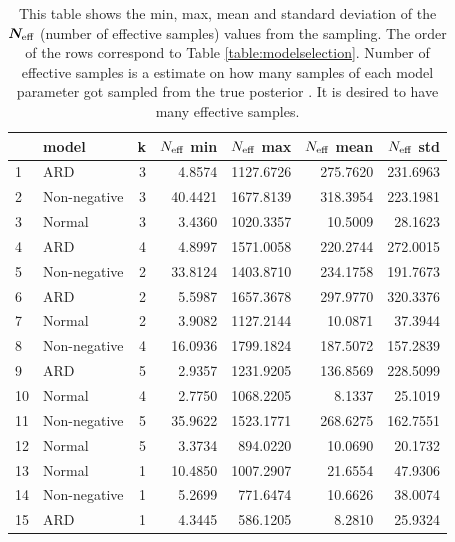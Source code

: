 \documentclass[12pt]{article}
\begin{document}
    \begin{table}[H]
        \centering
        \caption{This table shows the min, max, mean and standard deviation of the $\boldsymbol{N_{\text{eff}}}$ (number of effective samples) values from the sampling. The order of the rows correspond to Table \ref{table:modelselection}. Number of effective samples is a estimate on how many samples of each model parameter got sampled from the true posterior \cite{Neff}. It is desired to have many effective samples.}
        \label{table:neffs}
        \begin{tabular}{llr|rr|rr}
            \toprule
            {} &         model &  k &  $N_{\text{eff}}$ min &  $N_{\text{eff}}$ max &  $N_{\text{eff}}$ mean &  $N_{\text{eff}}$ std \\
            \midrule
            1  &           ARD &  3 &    4.8574 & 1127.6726 &   275.7620 &  231.6963 \\
            2  &  Non-negative &  3 &   40.4421 & 1677.8139 &   318.3954 &  223.1981 \\
            3  &        Normal &  3 &    3.4360 & 1020.3357 &    10.5009 &   28.1623 \\
            4  &           ARD &  4 &    4.8997 & 1571.0058 &   220.2744 &  272.0015 \\
            5  &  Non-negative &  2 &   33.8124 & 1403.8710 &   234.1758 &  191.7673 \\
            6  &           ARD &  2 &    5.5987 & 1657.3678 &   297.9770 &  320.3376 \\
            7  &        Normal &  2 &    3.9082 & 1127.2144 &    10.0871 &   37.3944 \\
            8  &  Non-negative &  4 &   16.0936 & 1799.1824 &   187.5072 &  157.2839 \\
            9  &           ARD &  5 &    2.9357 & 1231.9205 &   136.8569 &  228.5099 \\
            10 &        Normal &  4 &    2.7750 & 1068.2205 &     8.1337 &   25.1019 \\
            11 &  Non-negative &  5 &   35.9622 & 1523.1771 &   268.6275 &  162.7551 \\
            12 &        Normal &  5 &    3.3734 &  894.0220 &    10.0690 &   20.1732 \\
            13 &        Normal &  1 &   10.4850 & 1007.2907 &    21.6554 &   47.9306 \\
            14 &  Non-negative &  1 &    5.2699 &  771.6474 &    10.6626 &   38.0074 \\
            15 &           ARD &  1 &    4.3445 &  586.1205 &     8.2810 &   25.9324 \\
            \bottomrule
        \end{tabular}
    \end{table}
\end{document}
